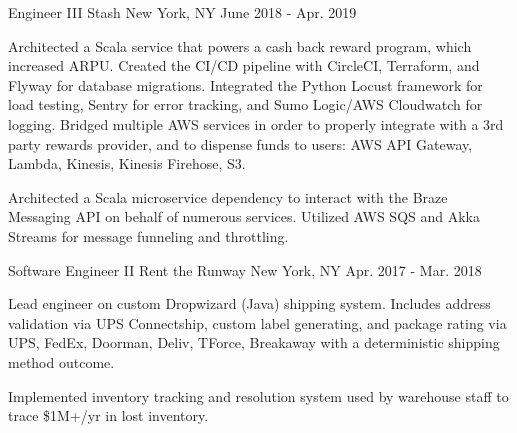 
\begin{cventries}

  \cventry
    {Engineer III} %
    {Stash} %
    {New York, NY} %
    {June 2018 - Apr. 2019} %
    {
      \begin{cvitems} %
        \item {Architected a Scala service that powers a cash back reward program, which increased ARPU. \newline Created the CI/CD pipeline with CircleCI, Terraform, and Flyway for database migrations. Integrated the Python Locust framework for load testing, Sentry for error tracking, and Sumo Logic/AWS Cloudwatch for logging. Bridged multiple AWS services in order to properly integrate with a 3rd party rewards provider, and to dispense funds to users: AWS API Gateway, Lambda, Kinesis, Kinesis Firehose, S3.}
        \item {Architected a Scala microservice dependency to interact with the Braze Messaging API on behalf of numerous services. Utilized AWS SQS and Akka Streams for message funneling and throttling.}
      \end{cvitems}
    }
\vspace{5mm}
  \cventry
    {Software Engineer II} %
    {Rent the Runway} %
    {New York, NY} %
    {Apr. 2017 - Mar. 2018} %
    {
      \begin{cvitems} %
        \item {Lead engineer on custom Dropwizard (Java) shipping system. Includes address validation via UPS Connectship, custom label generating, and package rating via UPS, FedEx, Doorman, Deliv, TForce, Breakaway with a deterministic shipping method outcome.}
        \item {Implemented inventory tracking and resolution system used by warehouse staff to trace \$1M+/yr in lost inventory.}
      \end{cvitems}
    }


\end{cventries}

